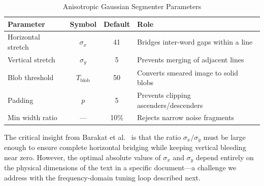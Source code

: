 \documentclass[12pt, a4paper]{article}
\begin{document}
\begin{table}[H]
\centering
\caption{Anisotropic Gaussian Segmenter Parameters}
\label{tab:seg_params}
\begin{tabular}{@{}lccp{5.5cm}@{}}
\toprule
\textbf{Parameter} & \textbf{Symbol} & \textbf{Default} & \textbf{Role} \\
\midrule
Horizontal stretch & $\sigma_x$ & 41 & Bridges inter-word gaps within a line \\
Vertical stretch & $\sigma_y$ & 5 & Prevents merging of adjacent lines \\
Blob threshold & $T_{\text{blob}}$ & 50 & Converts smeared image to solid blobs \\
Padding & $p$ & 5 & Prevents clipping ascenders/descenders \\
Min width ratio & --- & 10\% & Rejects narrow noise fragments \\
\bottomrule
\end{tabular}
\end{table}

The critical insight from Barakat et al.~\cite{barakat2020} is that the ratio $\sigma_x / \sigma_y$ must be large enough to ensure complete horizontal bridging while keeping vertical bleeding near zero. However, the optimal absolute values of $\sigma_x$ and $\sigma_y$ depend entirely on the physical dimensions of the text in a specific document---a challenge we address with the frequency-domain tuning loop described next.

\vspace{0.3em}
\noindent{}


\end{document}
